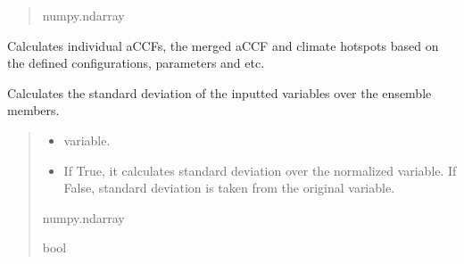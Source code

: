 \documentclass[a4paper,11pt,english]{sphinxmanual}
\begin{document}
\begin{fulllineitems}
\begin{fulllineitems}
\begin{quote}
\begin{description}
\sphinxAtStartPar
numpy.ndarray

\end{description}\end{quote}

\end{fulllineitems}


\begin{fulllineitems}
\label{\detokenize{modules:climaccf.accf.GeTaCCFs.get_accfs}}
\pysigstartsignatures
{}
\pysigstopsignatures
\sphinxAtStartPar
Calculates individual aCCFs, the merged aCCF and climate hotspots based on the defined configurations, parameters and etc.

\end{fulllineitems}


\begin{fulllineitems}
\label{\detokenize{modules:climaccf.accf.GeTaCCFs.get_std}}
\pysigstartsignatures
{}
\pysigstopsignatures
\sphinxAtStartPar
Calculates the standard deviation of the inputted variables over the ensemble members.
\begin{quote}\begin{description}
\begin{itemize}
\item {} 
\sphinxAtStartPar
{} \textendash{} variable.

\item {} 
\sphinxAtStartPar
{} \textendash{} If True, it calculates standard deviation over the normalized variable. If False, standard deviation is taken from the original variable.

\end{itemize}

\sphinxAtStartPar
numpy.ndarray

\sphinxAtStartPar
bool


\end{description}
\end{quote}
\end{fulllineitems}
\end{fulllineitems}
\end{document}
